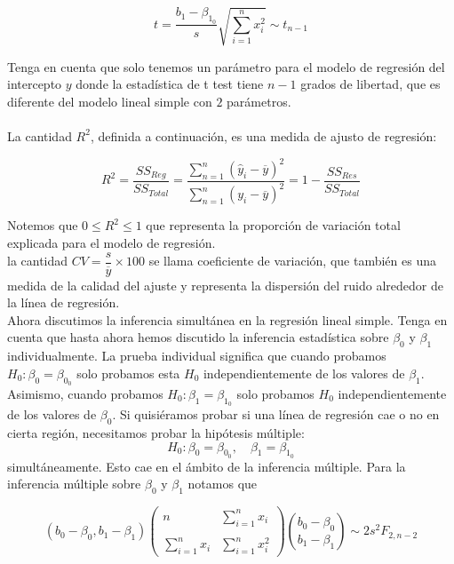 $$t=\dfrac{b_1-\beta_{1_0}}{s}\sqrt{\displaystyle\sum_{i=1}^nx_i^2}\sim t_{n-1}$$

Tenga en cuenta que solo tenemos un parámetro para el modelo de regresión del intercepto $y$ donde la estadística de t test tiene $n-1$ grados de libertad, que es diferente del modelo lineal simple con $2$ parámetros.\\\\

La cantidad $R^2$, definida a continuación, es una medida de ajusto de regresión:

\begin{tcolorbox}
    $$R^2=\dfrac{SS_{Reg}}{SS_{Total}}=\dfrac{\displaystyle\sum_{n=1}^n\left(\hat{y}_i-\overline{y}\right)^2}{\displaystyle\sum_{n=1}^n\left(y_i-\overline{y}\right)^2}=1-\dfrac{SS_{Res}}{SS_{Total}}$$
\end{tcolorbox}

Notemos que $0\leq R^2\leq 1$ que representa la proporción de variación total  explicada para el modelo de regresión.\\
la cantidad $CV=\dfrac{s}{\overline{y}}\times 100$ se llama coeficiente de variación, que también es una medida de la calidad del ajuste y representa la dispersión del ruido alrededor de la línea de regresión. \\

Ahora discutimos la inferencia simultánea en la regresión lineal simple. Tenga en cuenta que hasta ahora hemos discutido la inferencia estadística sobre $\beta_0$ y $\beta_1$ individualmente. La prueba individual significa que cuando probamos $H_0: \beta_0 = \beta_{0_0}$ solo probamos esta $H_0$ independientemente de los valores de $\beta_1$. Asimismo, cuando probamos $H_0: \beta_1 = \beta_{1_0}$ solo probamos $H_0$ independientemente de los valores de $\beta_0$. Si quisiéramos probar si una línea de regresión cae o no en cierta región, necesitamos probar la hipótesis múltiple: 
$$H_0: \beta_0 = \beta_{0_0}, \quad\beta_1 = \beta_{1_0}$$ 
simultáneamente. Esto cae en el ámbito de la inferencia múltiple. Para la inferencia múltiple sobre $\beta_0$ y $\beta_1$ notamos que

\begin{tcolorbox}
$$
\left(b_0-\beta_0,b_1-\beta_1\right)
\left(
    \begin{array}{cc}
	n & \displaystyle\sum_{i=1}^n x_i\\\\
	\displaystyle\sum_{i=1}^n x_i & \displaystyle\sum_{i=1}^n x_i^2
    \end{array}
\right)
{b_0-\beta_0\choose b_1-\beta_1}
\sim 2s^2F_{2,n-2}
$$
\end{tcolorbox}

